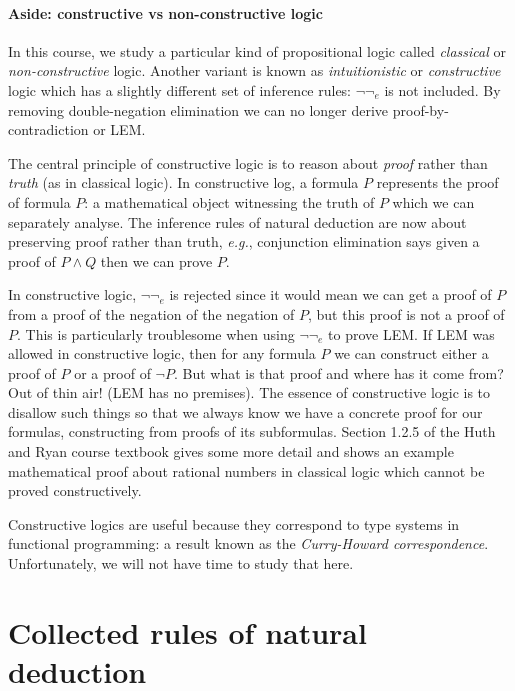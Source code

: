 \documentclass{article}
\theoremstyle{definition}
\newcommand{\eg}{\emph{e.g.}}
\begin{document}
\paragraph{Aside: constructive vs non-constructive logic}

In this course, we study a particular kind of propositional logic
called \emph{classical} or \emph{non-constructive} 
logic. Another variant is known as \emph{intuitionistic} or
\emph{constructive} logic which has a slightly different
set of inference rules: $\neg\neg_e$ is not included. By removing
double-negation elimination we can no longer derive
proof-by-contradiction or LEM.

The central principle of constructive logic is to reason about
\emph{proof} rather than \emph{truth} (as in classical logic). In
constructive log, a
formula $P$ represents the proof of formula $P$: a mathematical object
witnessing the truth of $P$ which we can separately analyse. The
inference rules of natural deduction are now about preserving proof
rather than truth, \eg{}, conjunction elimination says given a proof
of $P \wedge Q$ then we can prove $P$.

In constructive logic, $\neg\neg_e$ is rejected since it would mean we
can get a proof of $P$ from a proof of the negation of the negation of
$P$, but this proof is not a proof of $P$. This is particularly
troublesome when using $\neg\neg_e$ to prove LEM. If LEM was allowed
in constructive logic, then for any formula $P$ we can construct
either a proof of $P$ or a proof of $\neg P$. But what is that proof
and where has it come from? Out of thin air! (LEM has no
premises). The essence of constructive logic is to disallow such
things so that we always know we have a concrete proof for our
formulas, constructing from proofs of its subformulas. Section 1.2.5
of the Huth and Ryan course textbook gives some more detail and shows
an example mathematical proof about rational numbers in classical logic 
which cannot be proved constructively.

Constructive logics are useful because they correspond to type systems
in functional programming: a result known as the \emph{Curry-Howard
  correspondence}. Unfortunately, we will not have time to study that here.

\newpage

\section{Collected rules of natural deduction}
\end{document}
